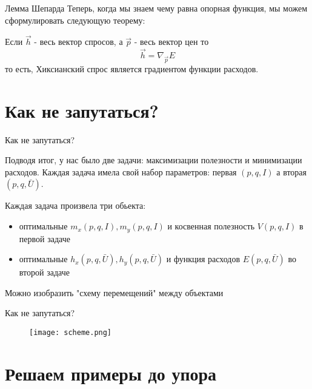 \documentclass{beamer}
\begin{document}
\begin{frame}{Лемма Шепарда}
Теперь, когда мы знаем чему равна опорная функция, мы можем сформулировать следующую теорему:
\begin{theorem}
Если $\vec{h}$ - весь вектор спросов, а $\vec{p}$ - весь вектор цен то
$$\vec{h} = \nabla_{\vec{p}} E$$
то есть, Хиксианский спрос является градиентом функции расходов.
\end{theorem}
\end{frame}

\section{Как не запутаться?}

\begin{frame}{Как не запутаться?}

Подводя итог, у нас было две задачи: максимизации полезности и минимизации расходов. Каждая задача имела свой набор параметров: первая $(p,q,I)$ а вторая $(p,q,\bar U)$. 

Каждая задача произвела три обьекта:

\begin{itemize}
\item оптимальные $m_x(p,q,I), m_y(p,q,I)$ и косвенная полезность $V(p,q,I)$ в первой задаче
\item оптимальные $h_x(p,q,\bar U), h_y(p,q,\bar U)$ и функция расходов $E(p,q,\bar U)$ во второй задаче
\end{itemize}
Можно изобразить "схему перемещений" между объектами

\end{frame}

\begin{frame}{Как не запутаться?}

\begin{figure}[hbt]
\centering
\texttt{[image: scheme.png]}
\end{figure}

\end{frame}

\section{Решаем примеры до упора}
\end{document}

